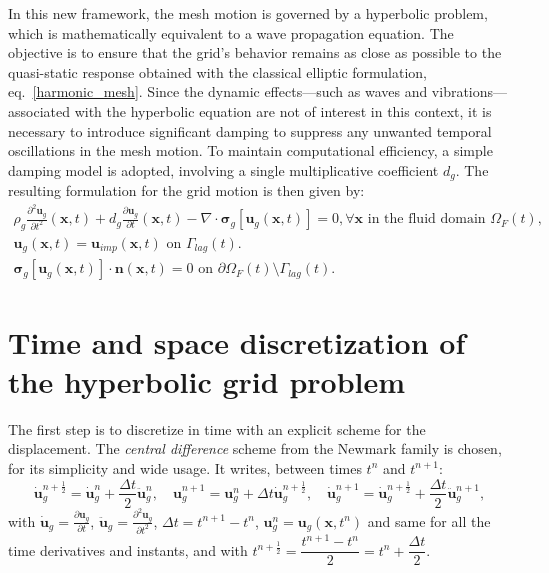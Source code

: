 In this new framework, the mesh motion is governed by a hyperbolic problem, which is mathematically equivalent to a wave propagation equation. The objective is to ensure that the grid’s behavior remains as close as possible to the quasi-static response obtained with the classical elliptic formulation, eq.~\eqref{harmonic_mesh}. Since the dynamic effects—such as waves and vibrations—associated with the hyperbolic equation are not of interest in this context, it is necessary to introduce significant damping to suppress any unwanted temporal oscillations in the mesh motion. To maintain computational efficiency, a simple damping model is adopted, involving a single multiplicative coefficient $d_g$. The resulting formulation for the grid motion is then given by:
\begin{equation}
\label{eq-final-grid-problem}
  \begin{array}{c}
    \displaystyle \rho_g \frac{\partial^2 \mathbf{u}_g}{\partial t^2}\left ( \mathbf{x}, t \right ) + d_g \frac{\partial \mathbf{u}_g}{\partial t}\left ( \mathbf{x}, t \right ) - \nabla \cdot \boldsymbol{\sigma}_g \left [ \mathbf{u}_g \left ( \mathbf{x}, t \right ) \right ] = 0, \forall \mathbf{x} \text{ in the fluid domain } \Omega_F (t), \\
    \mathbf{u}_g \left ( \mathbf{x}, t \right ) = \mathbf{u}_{imp} \left ( \mathbf{x}, t \right ) \text{ on } \Gamma_{lag}(t). \\
    \boldsymbol{\sigma}_g \left [ \mathbf{u}_g \left ( \mathbf{x}, t \right ) \right ] \cdot \mathbf{n} \left ( \mathbf{x}, t \right ) = 0  \text{ on } \partial \Omega_F (t) \setminus \Gamma_{lag}(t).
  \end{array}
\end{equation}

\section{Time and space discretization of the hyperbolic grid problem}

The first step is to discretize in time with an explicit scheme for the displacement. The \textit{central difference} scheme from the Newmark family \cite{newmark_method_1959} is chosen, for its simplicity and wide usage. It writes, between times $t^n$ and $t^{n+1}$:
\begin{equation}
     \dot{\mathbf{u}}_g^{n+\frac{1}{2}}  = \dot{\mathbf{u}}_g^n + \frac{\Delta t}{2} \ddot{\mathbf{u}}_g^n, \quad 
     \mathbf{u}_g^{n+1}  = \mathbf{u}_g^n + \Delta t \dot{\mathbf{u}}_g^{n+\frac{1}{2}}, \quad
     \dot{\mathbf{u}}_g^{n+1}  = \dot{\mathbf{u}}_g^{n+\frac{1}{2}} + \frac{\Delta t}{2} \ddot{\mathbf{u}}_g^{n+1},
\end{equation}
\noindent with $\dot{\mathbf{u}}_g = \frac{\partial \mathbf{u}_g}{\partial t}$, $\ddot{\mathbf{u}}_g = \frac{\partial^2 \mathbf{u}_g}{\partial t^2}$, $\Delta t = t^{n+1}-t^n$,  $\mathbf{u}_g^n = \mathbf{u}_g (\mathbf{x}, t^n)$ and same for all the time derivatives and instants, and with $t^{n+\frac{1}{2}} = \dfrac{t^{n+1}-t^n}{2} = t^n + \dfrac{\Delta t}{2}$.

